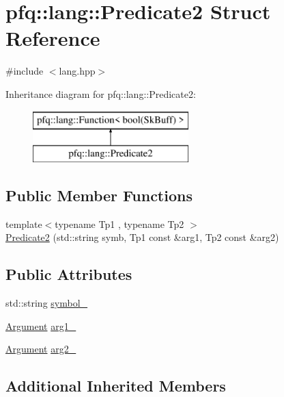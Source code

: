\hypertarget{structpfq_1_1lang_1_1Predicate2}{\section{pfq\+:\+:lang\+:\+:Predicate2 Struct Reference}
\label{structpfq_1_1lang_1_1Predicate2}
}


{\ttfamily \#include $<$lang.\+hpp$>$}

Inheritance diagram for pfq\+:\+:lang\+:\+:Predicate2\+:\begin{figure}[H]
\begin{center}
\leavevmode
\includegraphics[height=2.000000cm]{structpfq_1_1lang_1_1Predicate2}
\end{center}
\end{figure}
\subsection*{Public Member Functions}
\begin{DoxyCompactItemize}
\item 
{\footnotesize template$<$typename Tp1 , typename Tp2 $>$ }\\\hyperlink{structpfq_1_1lang_1_1Predicate2_a7e511b7bb35b3fd452af15bc9eba26d1}{Predicate2} (std\+::string symb, Tp1 const \&arg1, Tp2 const \&arg2)
\end{DoxyCompactItemize}
\subsection*{Public Attributes}
\begin{DoxyCompactItemize}
\item 
std\+::string \hyperlink{structpfq_1_1lang_1_1Predicate2_ae6a811624aaa1b8ddc5998b42bab8618}{symbol\+\_\+}
\item 
\hyperlink{structpfq_1_1lang_1_1Argument}{Argument} \hyperlink{structpfq_1_1lang_1_1Predicate2_a9d1bc0663b638551913871c35a7706a7}{arg1\+\_\+}
\item 
\hyperlink{structpfq_1_1lang_1_1Argument}{Argument} \hyperlink{structpfq_1_1lang_1_1Predicate2_aa25ff9d4aa934222dd808efd7320922c}{arg2\+\_\+}
\end{DoxyCompactItemize}
\subsection*{Additional Inherited Members}


